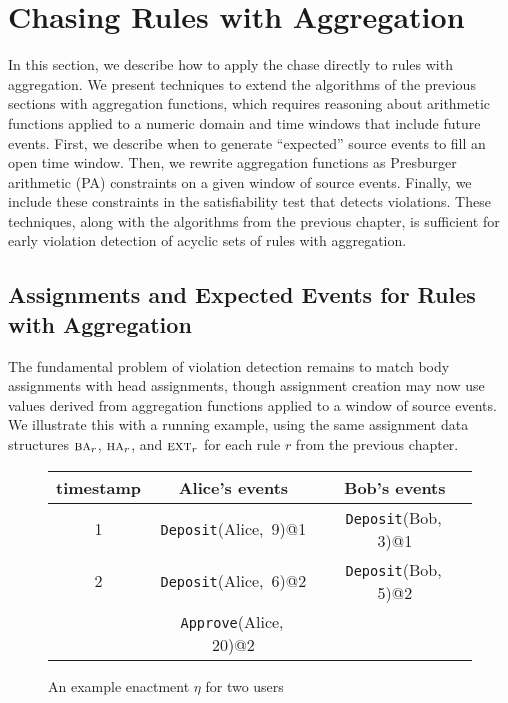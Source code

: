 \section{Chasing Rules with Aggregation}
\label{section:chasing-rules-with-aggregation}

In this section, we describe how to apply the chase
directly to rules with aggregation.
We present techniques
to extend the algorithms of the previous sections
with aggregation functions,
which requires reasoning about
arithmetic functions applied to a numeric domain
and time windows that include future events.
First, we describe when to generate
``expected'' source events to fill an open time window.
Then, we rewrite aggregation functions as Presburger arithmetic (PA) constraints on a given window of source events.
Finally, we include these constraints
in the satisfiability test that detects violations.
These techniques, along with the algorithms
from the previous chapter, is sufficient
for early violation detection of acyclic sets of rules
with aggregation.

\subsection{Assignments and Expected Events for Rules with Aggregation}

The fundamental problem of violation detection
remains to match body assignments with head assignments,
though assignment creation may now use 
values derived from aggregation functions
applied to a window of source events.
We illustrate this with a running example,
using the same assignment
data structures
$\BODY/_r$, $\HEAD/_r$, and $\textsc{ext}_r$ for each rule $r$
from the previous chapter.

\begin{figure}[ht]
  \centering
  \begin{tabular}{|c|c|c|}
    \hline
    {timestamp} & \mbox{Alice}'s events & \mbox{Bob}'s events \\
    \hline
    1 & \mbox{\tt Deposit}(\mbox{Alice},\, 9)@1    & \mbox{\tt Deposit}(\mbox{Bob},\, 3)@1   \\
      \hline
    2 & \mbox{\tt Deposit}(\mbox{Alice},\, 6)@2    & \mbox{\tt Deposit}(\mbox{Bob},\, 5)@2  \\
      & \mbox{\tt Approve}(\mbox{Alice},\, 20)@2     &                                      \\
    \hline
    \end{tabular}
\caption{An example enactment $\eta$ for two users}
  \label{fig:example-stream-eta-1}
\end{figure}

